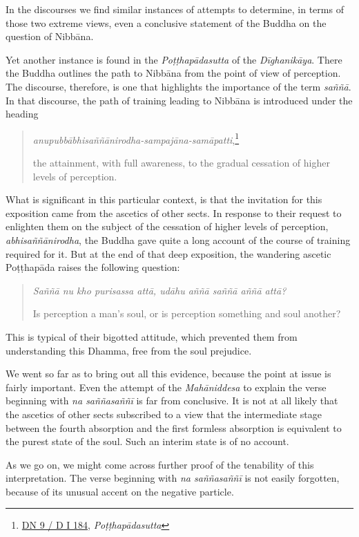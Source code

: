 In the discourses we find similar instances of attempts to determine, in terms of those two extreme views, even a conclusive statement of the Buddha on the question of Nibbāna.

Yet another instance is found in the \emph{Poṭṭhapādasutta} of the \emph{Dīghanikāya}. There the Buddha outlines the path to Nibbāna from the point of view of perception. The discourse, therefore, is one that highlights the importance of the term \emph{saññā}. In that discourse, the path of training leading to Nibbāna is introduced under the heading

\begin{quote}
\emph{anupubbābhisaññānirodha-sampajāna-samāpatti},\footnote{\href{https://suttacentral.net/dn9/pli/ms}{DN 9 / D I 184}, \emph{Poṭṭhapādasutta}}

the attainment, with full awareness, to the gradual cessation of higher levels of perception.
\end{quote}

What is significant in this particular context, is that the invitation for this exposition came from the ascetics of other sects. In response to their request to enlighten them on the subject of the cessation of higher levels of perception, \emph{abhisaññānirodha}, the Buddha gave quite a long account of the course of training required for it. But at the end of that deep exposition, the wandering ascetic Poṭṭhapāda raises the following question:

\begin{quote}
\emph{Saññā nu kho purisassa attā, udāhu aññā saññā aññā attā?}

Is perception a man's soul, or is perception something and soul another?
\end{quote}

This is typical of their bigotted attitude, which prevented them from understanding this Dhamma, free from the soul prejudice.

We went so far as to bring out all this evidence, because the point at issue is fairly important. Even the attempt of the \emph{Mahāniddesa} to explain the verse beginning with \emph{na saññasaññī} is far from conclusive. It is not at all likely that the ascetics of other sects subscribed to a view that the intermediate stage between the fourth absorption and the first formless absorption is equivalent to the purest state of the soul. Such an interim state is of no account.

As we go on, we might come across further proof of the tenability of this interpretation. The verse beginning with \emph{na saññasaññī} is not easily forgotten, because of its unusual accent on the negative particle.

